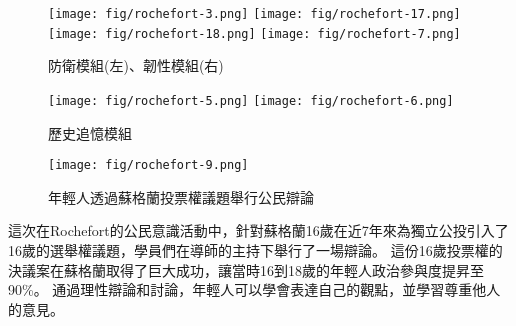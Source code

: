 \documentclass[a4paper,14pt]{extarticle}
\theoremstyle{plain}
\theoremstyle{remark}
\numberwithin{equation}{section}
\begin{document}
\begin{itemize}
    \begin{figure}[H]
      \centering
        \texttt{[image: fig/rochefort-3.png]}
        \texttt{[image: fig/rochefort-17.png]}
        \\ \vspace{0.1cm}
        \texttt{[image: fig/rochefort-18.png]}
        \texttt{[image: fig/rochefort-7.png]}
      \caption{防衛模組(左)、韌性模組(右)}
    \end{figure}

    \begin{figure}[H]
      \centering
        \texttt{[image: fig/rochefort-5.png]}
        \texttt{[image: fig/rochefort-6.png]}
      \caption{歷史追憶模組}
    \end{figure}

    \begin{figure}[H]
      \centering
        \texttt{[image: fig/rochefort-9.png]}
      \caption{年輕人透過蘇格蘭投票權議題舉行公民辯論}
    \end{figure}

這次在Rochefort的公民意識活動中，針對蘇格蘭16歲在近7年來為獨立公投引入了16歲的選舉權議題，學員們在導師的主持下舉行了一場辯論。
這份16歲投票權的決議案在蘇格蘭取得了巨大成功，讓當時16到18歲的年輕人政治參與度提昇至90\%。
通過理性辯論和討論，年輕人可以學會表達自己的觀點，並學習尊重他人的意見。










\end{itemize}
\end{document}
